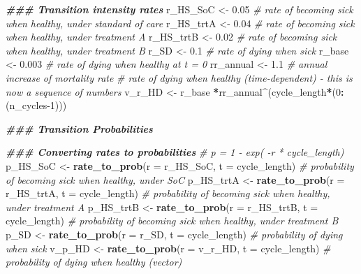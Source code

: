 \documentclass[
]{article}
\newenvironment{Shaded}{\begin{snugshade}}{\end{snugshade}}
\newcommand{\AttributeTok}[1]{\textcolor[rgb]{0.13,0.29,0.53}{#1}}
\newcommand{\CommentTok}[1]{\textcolor[rgb]{0.56,0.35,0.01}{\textit{#1}}}
\newcommand{\DecValTok}[1]{\textcolor[rgb]{0.00,0.00,0.81}{#1}}
\newcommand{\DocumentationTok}[1]{\textcolor[rgb]{0.56,0.35,0.01}{\textbf{\textit{#1}}}}
\newcommand{\FloatTok}[1]{\textcolor[rgb]{0.00,0.00,0.81}{#1}}
\newcommand{\FunctionTok}[1]{\textcolor[rgb]{0.13,0.29,0.53}{\textbf{#1}}}
\newcommand{\NormalTok}[1]{#1}
\newcommand{\OtherTok}[1]{\textcolor[rgb]{0.56,0.35,0.01}{#1}}
\newcommand{\SpecialCharTok}[1]{\textcolor[rgb]{0.81,0.36,0.00}{\textbf{#1}}}
\begin{document}
\begin{Shaded}
\begin{Highlighting}[]
\DocumentationTok{\#\#\# Transition intensity rates}
\NormalTok{r\_HS\_SoC  }\OtherTok{\textless{}{-}} \FloatTok{0.05}  \CommentTok{\# rate of becoming sick when healthy, under standard of care}
\NormalTok{r\_HS\_trtA }\OtherTok{\textless{}{-}} \FloatTok{0.04}  \CommentTok{\# rate of becoming sick when healthy, under treatment A}
\NormalTok{r\_HS\_trtB }\OtherTok{\textless{}{-}} \FloatTok{0.02}  \CommentTok{\# rate of becoming sick when healthy, under treatment B}
\NormalTok{r\_SD      }\OtherTok{\textless{}{-}} \FloatTok{0.1}   \CommentTok{\# rate of dying when sick}
\NormalTok{r\_base  }\OtherTok{\textless{}{-}} \FloatTok{0.003} \CommentTok{\# rate of dying when healthy at t = 0}
\NormalTok{rr\_annual  }\OtherTok{\textless{}{-}} \FloatTok{1.1}  \CommentTok{\# annual increase of mortality rate}
\CommentTok{\# rate of dying when healthy (time{-}dependent) {-} this is now a sequence of numbers}
\NormalTok{v\_r\_HD    }\OtherTok{\textless{}{-}}\NormalTok{ r\_base }\SpecialCharTok{*}\NormalTok{rr\_annual}\SpecialCharTok{\^{}}\NormalTok{(cycle\_length}\SpecialCharTok{*}\NormalTok{(}\DecValTok{0}\SpecialCharTok{:}\NormalTok{(n\_cycles}\DecValTok{{-}1}\NormalTok{)))}


\DocumentationTok{\#\#\#  Transition Probabilities}

\DocumentationTok{\#\#\# Converting rates to probabilities}
\CommentTok{\# p = 1 {-} exp( {-}r * cycle\_length)}
\NormalTok{p\_HS\_SoC  }\OtherTok{\textless{}{-}} \FunctionTok{rate\_to\_prob}\NormalTok{(}\AttributeTok{r =}\NormalTok{ r\_HS\_SoC, }\AttributeTok{t =}\NormalTok{ cycle\_length)  }\CommentTok{\# probability  of becoming sick when healthy, under SoC}
\NormalTok{p\_HS\_trtA }\OtherTok{\textless{}{-}} \FunctionTok{rate\_to\_prob}\NormalTok{(}\AttributeTok{r =}\NormalTok{ r\_HS\_trtA, }\AttributeTok{t =}\NormalTok{ cycle\_length) }\CommentTok{\# probability of becoming sick when healthy, under treatment A}
\NormalTok{p\_HS\_trtB }\OtherTok{\textless{}{-}} \FunctionTok{rate\_to\_prob}\NormalTok{(}\AttributeTok{r =}\NormalTok{ r\_HS\_trtB, }\AttributeTok{t =}\NormalTok{ cycle\_length) }\CommentTok{\# probability of becoming sick when healthy, under treatment B}
\NormalTok{p\_SD      }\OtherTok{\textless{}{-}} \FunctionTok{rate\_to\_prob}\NormalTok{(}\AttributeTok{r =}\NormalTok{ r\_SD, }\AttributeTok{t =}\NormalTok{ cycle\_length)      }\CommentTok{\# probability of dying when sick}
\NormalTok{v\_p\_HD    }\OtherTok{\textless{}{-}} \FunctionTok{rate\_to\_prob}\NormalTok{(}\AttributeTok{r =}\NormalTok{ v\_r\_HD, }\AttributeTok{t =}\NormalTok{ cycle\_length)    }\CommentTok{\# probability of dying when healthy (vector)}


\end{Highlighting}
\end{Shaded}
\end{document}
